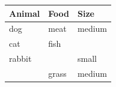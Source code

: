 \documentclass{article}
\begin{document}
\begin{tabular}{lll}
\toprule
Animal & Food & Size \\
\midrule
dog & meat & medium \\
cat & fish &  \\
rabbit &  & small \\
 & grass & medium \\
\bottomrule
\end{tabular}
\end{document}
